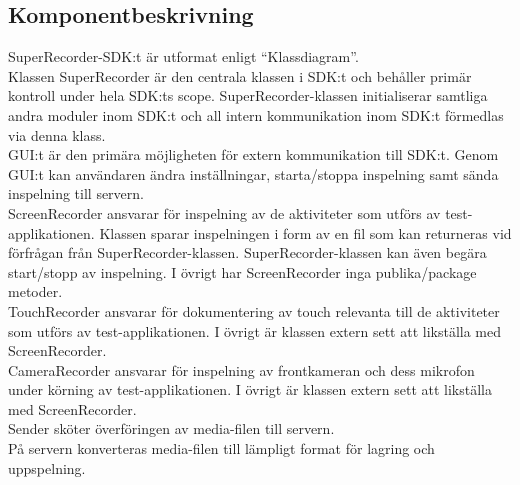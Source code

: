 \subsection{Komponentbeskrivning}

SuperRecorder-SDK:t är utformat enligt ``Klassdiagram''. \\

Klassen SuperRecorder är den centrala klassen i SDK:t och behåller primär kontroll under hela SDK:ts scope. SuperRecorder-klassen initialiserar samtliga andra moduler inom SDK:t och all intern kommunikation inom SDK:t förmedlas via denna klass. \\

GUI:t är den primära möjligheten för extern kommunikation till SDK:t. Genom GUI:t kan användaren ändra inställningar, starta/stoppa inspelning samt sända inspelning till servern. \\

ScreenRecorder ansvarar för inspelning av de aktiviteter som utförs av test-applikationen. Klassen sparar inspelningen i form av en fil som kan returneras vid förfrågan från SuperRecorder-klassen. SuperRecorder-klassen kan även begära start/stopp av inspelning. I övrigt har ScreenRecorder inga publika/package metoder. \\

TouchRecorder ansvarar för dokumentering av touch relevanta till de aktiviteter som utförs av test-applikationen. I övrigt är klassen extern sett att likställa med ScreenRecorder. \\

CameraRecorder ansvarar för inspelning av frontkameran och dess mikrofon under körning av test-applikationen. I övrigt är klassen extern sett att likställa med ScreenRecorder. \\

Sender sköter överföringen av media-filen till servern. \\

På servern konverteras media-filen till lämpligt format för lagring och uppspelning.
